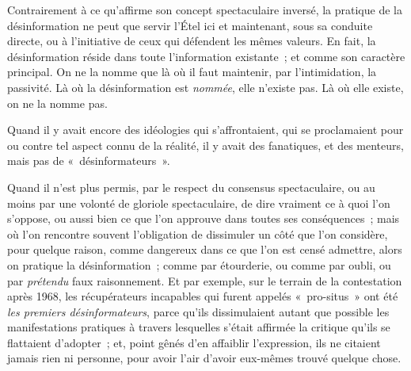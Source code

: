 \documentclass[french,twoside]{book} %
\def\mednobreak{\ifdim\lastskip<\medskipamount
  \removelastskip\nopagebreak\medskip\fi}
\newcommand{\labelblock}[1]{\medbreak{\noindent\color{rubric}\bfseries #1}\par\mednobreak}
\begin{document}
Contrairement à ce qu’affirme son concept spectaculaire inversé, la pratique de la désinformation ne peut que servir l’Étel ici et maintenant, sous sa conduite directe, ou à l’initiative de ceux qui défendent les mêmes valeurs. En fait, la désinformation réside dans toute l’information existante ; et comme son caractère principal. On ne la nomme que là où il faut maintenir, par l’intimidation, la passivité. Là où la désinformation est \emph{nommée}, elle n’existe pas. Là où elle existe, on ne la nomme pas.\par
Quand il y avait encore des idéologies qui s’affrontaient, qui se proclamaient pour ou contre tel aspect connu de la réalité, il y avait des fanatiques, et des menteurs, mais pas de « désinformateurs ».\par
Quand il n’est plus permis, par le respect du consensus spectaculaire, ou au moins par une volonté de gloriole spectaculaire, de dire vraiment ce à quoi l’on s’oppose, ou aussi bien ce que l’on approuve dans toutes ses conséquences ; mais où l’on rencontre souvent l’obligation de dissimuler un côté que l’on considère, pour quelque raison, comme dangereux dans ce que l’on est censé admettre, alors on pratique la désinformation ; comme par étourderie, ou comme par oubli, ou par \emph{prétendu} faux raisonnement. Et par exemple, sur le terrain de la contestation après 1968, les récupérateurs incapables qui furent appelés « pro-situs » ont été \emph{les premiers désinformateurs}, parce qu’ils dissimulaient autant que possible les manifestations pratiques à travers lesquelles s’était affirmée la critique qu’ils se flattaient d’adopter ; et, point gênés d’en affaiblir l’expression, ils ne citaient jamais rien ni personne, pour avoir l’air d’avoir eux-mêmes trouvé quelque chose.\par

\labelblock{XVII}
\end{document}

